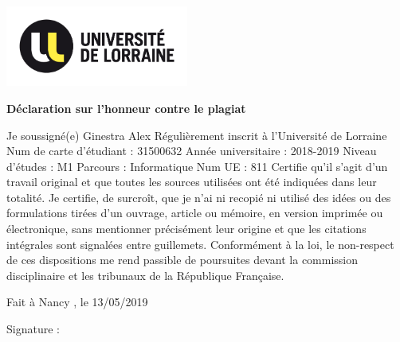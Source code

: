 \documentclass[11pt]{article}
\begin{document}
\cleardoublepage
\begin{flushleft}
\includegraphics[width=6cm]{UL_LOGO.jpg} %
\end{flushleft}

\vspace*{15mm}
\begin{center}
	{\bfseries \huge D\'{e}claration sur l'honneur contre le plagiat}
\end{center}
\vspace*{30mm}
Je soussign\'{e}(e) Ginestra Alex
\newline
R\'{e}guli\`{e}rement inscrit \`{a} l'Universit\'{e} de Lorraine
\newline
Num de carte d'\'{e}tudiant : 31500632
\newline
Ann\'{e}e universitaire : 2018-2019
\newline
Niveau d'\'{e}tudes : M1
\newline
Parcours : Informatique
\newline
Num UE : 811
\newline
\newline
Certifie qu'il s'agit d'un travail original et que toutes les sources utilis\'{e}es ont \'{e}t\'{e} indiqu\'{e}es dans leur totalit\'{e}. Je certifie, de surcro\^{i}t, que je n'ai ni recopi\'{e} ni utilis\'{e} des id\'{e}es ou des formulations tir\'{e}es d'un ouvrage, article ou m\'{e}moire, en version imprim\'{e}e ou \'{e}lectronique, sans mentionner pr\'{e}cis\'{e}ment leur origine et que les citations int\'{e}grales sont signal\'{e}es entre guillemets.
\newline
\newline
Conform\'{e}ment \`{a} la loi, le non-respect de ces dispositions me rend passible de poursuites devant la commission disciplinaire et les tribunaux de la R\'{e}publique Fran\c{c}aise.
\vspace*{20mm}
\begin{flushright}
Fait \`{a}  Nancy , le 13/05/2019
\end{flushright}
\vspace*{5mm}
\begin{flushright}
 Signature :  \,\,\,\,\,\,\,\,\,\,\,\,\,\,\,\,\,\,\,\,\,\,\,\,\,\,\,\,\,\,\,\,\,\,\,\,\,\,\,\,\,\,\,\,\,\,
\end{flushright}
\end{document}
